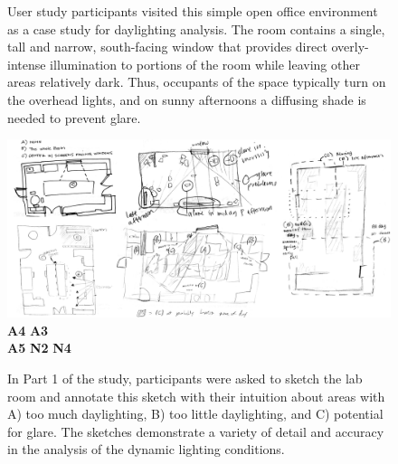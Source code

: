 \begin{figure}[t]
\caption{User study participants visited this simple open office
  environment as a case study for daylighting analysis.  The room
  contains a single, tall and narrow, south-facing window that
  provides direct overly-intense illumination to portions of the room
  while leaving other areas relatively dark.  Thus, occupants of the
  space typically turn on the overhead lights, and on sunny afternoons
  a diffusing shade is needed to prevent glare.
}
\label{figure:example_room}
\end{figure}




\begin{figure}[t]
%
\includegraphics[width=7.0in]{../gi2012_userstudy/images/sketches/all_together}%
%
\vspace{-2.7in}
{\bf A4} \hspace{1.9in}
{\bf A3}
\vspace{2.3in}
\\
{\bf A5} \hspace{1.8in}
{\bf N2} \hspace{3in}
{\bf N4}
\vspace{-0.1in}\\
%
\caption{In Part 1 of the study, participants were asked to sketch the
  lab room and annotate this sketch with their intuition about areas
  with A) too much daylighting, B) too little daylighting, and C)
  potential for glare.  The sketches demonstrate a variety of detail
  and accuracy in the analysis of the dynamic lighting conditions. }
\label{figure:sketches}
\end{figure}







